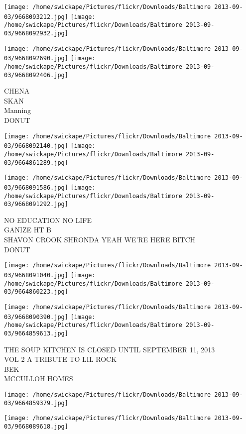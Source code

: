 \documentclass[10pt,letterpaper]{article}
\begin{document}
\texttt{[image: /home/swickape/Pictures/flickr/Downloads/Baltimore 2013-09-03/9668093212.jpg]}
\texttt{[image: /home/swickape/Pictures/flickr/Downloads/Baltimore 2013-09-03/9668092932.jpg]}

\texttt{[image: /home/swickape/Pictures/flickr/Downloads/Baltimore 2013-09-03/9668092690.jpg]}
\texttt{[image: /home/swickape/Pictures/flickr/Downloads/Baltimore 2013-09-03/9668092406.jpg]}

CHENA\\
SKAN\\
Manning\\
DONUT
\pagebreak

\texttt{[image: /home/swickape/Pictures/flickr/Downloads/Baltimore 2013-09-03/9668092140.jpg]}
\texttt{[image: /home/swickape/Pictures/flickr/Downloads/Baltimore 2013-09-03/9664861289.jpg]}

\texttt{[image: /home/swickape/Pictures/flickr/Downloads/Baltimore 2013-09-03/9668091586.jpg]}
\texttt{[image: /home/swickape/Pictures/flickr/Downloads/Baltimore 2013-09-03/9668091292.jpg]}

NO EDUCATION NO LIFE\\
GANIZE HT B\\
SHAVON CROOK SHRONDA YEAH WE'RE HERE BITCH\\
DONUT
\pagebreak

\texttt{[image: /home/swickape/Pictures/flickr/Downloads/Baltimore 2013-09-03/9668091040.jpg]}
\texttt{[image: /home/swickape/Pictures/flickr/Downloads/Baltimore 2013-09-03/9664860223.jpg]}

\texttt{[image: /home/swickape/Pictures/flickr/Downloads/Baltimore 2013-09-03/9668090390.jpg]}
\texttt{[image: /home/swickape/Pictures/flickr/Downloads/Baltimore 2013-09-03/9664859613.jpg]}

THE SOUP KITCHEN IS CLOSED UNTIL SEPTEMBER 11, 2013\\
VOL 2 A TRIBUTE TO LIL ROCK\\
BEK\\
MCCULLOH HOMES
\pagebreak

\texttt{[image: /home/swickape/Pictures/flickr/Downloads/Baltimore 2013-09-03/9664859379.jpg]}

\vspace{0.25in}
\texttt{[image: /home/swickape/Pictures/flickr/Downloads/Baltimore 2013-09-03/9668089618.jpg]}
\end{document}
